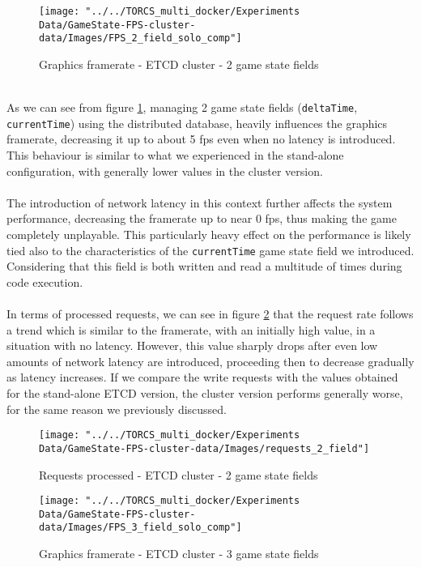 \begin{figure}[h!]
	\centering
	\texttt{[image: "../../TORCS\_multi\_docker/Experiments Data/GameState-FPS-cluster-data/Images/FPS\_2\_field\_solo\_comp"]}
	\caption[Graphics framerate - ETCD cluster - 2 game state fields]{Graphics framerate - ETCD cluster - 2 game state fields}
	\label{fig:fps-2-field-etcd-cluster}
\end{figure}
\\ As we can see from figure \ref{fig:fps-2-field-etcd-cluster}, managing 2 game state fields (\texttt{deltaTime}, \texttt{currentTime}) using the distributed database, heavily influences the graphics framerate, decreasing it up to about 5 fps even when no latency is introduced. This behaviour is similar to what we experienced in the stand-alone configuration, with generally lower values in the cluster version. \\ \\
The introduction of network latency in this context further affects the system performance, decreasing the framerate up to near 0 fps, thus making the game completely unplayable. This particularly heavy effect on the performance is likely tied also to the characteristics of the \texttt{currentTime} game state field we introduced. Considering that this field is both written and read a multitude of times during code execution. \\ \\
In terms of processed requests, we can see in figure \ref{fig:requests-2-field-etcd-cluster} that the request rate follows a trend which is similar to the framerate, with an initially high value, in a situation with no latency. However, this value sharply drops after even low amounts of network latency are introduced, proceeding then to decrease gradually as latency increases. If we compare the write requests with the values obtained for the stand-alone ETCD version, the cluster version performs generally worse, for the same reason we previously discussed. \\
\begin{figure}[h!]
	\centering
	\texttt{[image: "../../TORCS\_multi\_docker/Experiments Data/GameState-FPS-cluster-data/Images/requests\_2\_field"]}
	\caption[Requests processed - ETCD cluster - 2 game state fields]{Requests processed - ETCD cluster - 2 game state fields}
	\label{fig:requests-2-field-etcd-cluster}
\end{figure}
\begin{figure}[h!]
	\centering
	\texttt{[image: "../../TORCS\_multi\_docker/Experiments Data/GameState-FPS-cluster-data/Images/FPS\_3\_field\_solo\_comp"]}
	\caption[Graphics framerate - ETCD cluster - 3 game state fields]{Graphics framerate - ETCD cluster - 3 game state fields}
	\label{fig:fps-3-field-etcd-cluster}
\end{figure}
